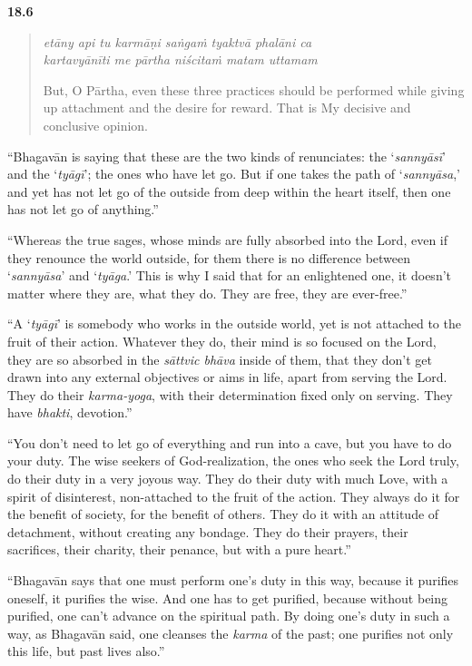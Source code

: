 \par\noindent\textbf{18.6}\par
\begin{verse}
\textit{etāny api tu karmāṇi saṅgaṁ tyaktvā phalāni ca} \\
\textit{kartavyānīti me pārtha niścitaṁ matam uttamam}

\noindent But, O Pārtha, even these three practices should be performed while giving up attachment and the desire for reward. That is My decisive and conclusive opinion.
\end{verse}
\par


\enquote{Bhagavān is saying that these are the two kinds of renunciates: the \enquote{\textit{sannyāsī}} and the \enquote{\textit{tyāgī}}; the ones who have let go. But if one takes the path of \enquote{\textit{sannyāsa},} and yet has not let go of the outside from deep within the heart itself, then one has not let go of anything.}

\enquote{Whereas the true sages, whose minds are fully absorbed into the Lord, even if they renounce the world outside, for them there is no difference between \enquote{\textit{sannyāsa}} and \enquote{\textit{tyāga}.} This is why I said that for an enlightened one, it doesn’t matter where they are, what they do. They are free, they are ever-free.}

\enquote{A \enquote{\textit{tyāgī}} is somebody who works in the outside world, yet is not attached to the fruit of their action. Whatever they do, their mind is so focused on the Lord, they are so absorbed in the \textit{sāttvic bhāva} inside of them, that they don’t get drawn into any external objectives or aims in life, apart from serving the Lord. They do their \textit{karma-yoga}, with their determination fixed only on serving. They have \textit{bhakti}, devotion.}

\enquote{You don’t need to let go of everything and run into a cave, but you have to do your duty. The wise seekers of God-realization, the ones who seek the Lord truly, do their duty in a very joyous way. They do their duty with much Love, with a spirit of disinterest, non-attached to the fruit of the action. They always do it for the benefit of society, for the benefit of others. They do it with an attitude of detachment, without creating any bondage. They do their prayers, their sacrifices, their charity, their penance, but with a pure heart.}

\enquote{Bhagavān says that one must perform one’s duty in this way, because it purifies oneself, it purifies the wise. And one has to get purified, because without being purified, one can’t advance on the spiritual path. By doing one’s duty in such a way, as Bhagavān said, one cleanses the \textit{karma} of the past; one purifies not only this life, but past lives also.}

